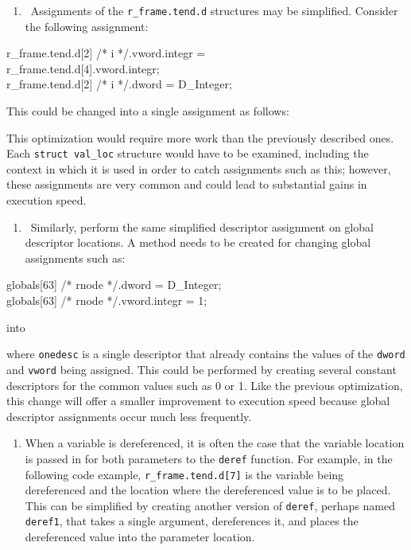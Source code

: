 \liststyleLxxxix
\begin{enumerate}
\item 
\ Assignments of the \texttt{r\_frame.tend.d} structures may be simplified. Consider the following assignment:
\end{enumerate}
\goodbreak
\begin{iconcode}
r\_frame.tend.d[2] /* i */.vword.integr =\\
\>r\_frame.tend.d[4].vword.integr;\\
r\_frame.tend.d[2] /* i */.dword = D\_Integer;\\
\end{iconcode}


This could be changed into a single assignment as follows:



This optimization would require more work than the previously
described ones. Each \texttt{struct val\_loc} structure would have
to be examined, including the context in which it is used in order to
catch assignments such as this; however, these assignments are very
common and could lead to substantial gains in execution speed.

\liststyleLxl
\begin{enumerate}
\item 
\ Similarly, perform the same simplified descriptor assignment on global descriptor locations. A method needs to be
created for changing global assignments such as:
\end{enumerate}
\goodbreak
\begin{iconcode}
globals[63] /* rnode */.dword = D\_Integer;\\
globals[63] /* rnode */.vword.integr = 1;\\
\end{iconcode}

\noindent
into


\noindent where \texttt{onedesc} is a single descriptor that already
contains the values of the \texttt{dword} and \texttt{vword} being
assigned. This could be performed by creating several constant
descriptors for the common values such as 0 or 1.  Like the previous
optimization, this change will offer a smaller improvement to
execution speed because global descriptor assignments occur much less
frequently.

\liststyleLxli
\begin{enumerate}
\item 
When a variable is dereferenced, it is often the case that the
variable location is passed in for both parameters to the
\texttt{deref} function. For example, in the following code example,
\texttt{r\_frame.tend.d[7]} is the variable being dereferenced and the
location where the dereferenced value is to be placed. This can be
simplified by creating another version of \texttt{deref}, perhaps
named \texttt{deref1}, that takes a single argument, dereferences it,
and places the dereferenced value into the parameter location.
\end{enumerate}

